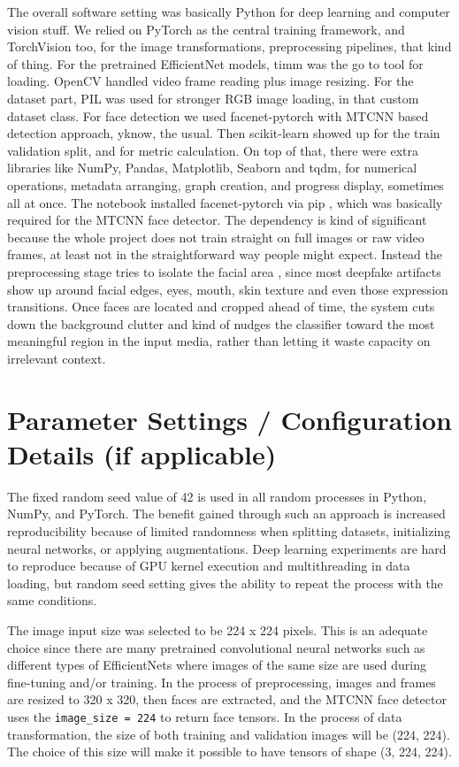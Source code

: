 \documentclass[12pt,a4paper]{report}
\begin{document}
The overall software setting was basically Python for deep learning and computer vision stuff. We relied on PyTorch as the central training framework, and TorchVision too, for the image transformations, preprocessing pipelines, that kind of thing. For the pretrained EfficientNet models, timm was the go to tool for loading. OpenCV handled video frame reading plus image resizing. For the dataset part, PIL was used for stronger RGB image loading, in that custom dataset class. For face detection we used facenet-pytorch with MTCNN based detection approach, yknow, the usual. Then scikit-learn showed up for the train validation split, and for metric calculation.  
On top of that, there were extra libraries like NumPy, Pandas, Matplotlib, Seaborn and tqdm, for numerical operations, metadata arranging, graph creation, and progress display, sometimes all at once.
The notebook installed facenet-pytorch via pip , which was basically required for the MTCNN face detector. The dependency is kind of significant because the whole project does not train straight on full images or raw video frames, at least not in the straightforward way people might expect. Instead the preprocessing stage tries to isolate the facial area , since most deepfake artifacts show up around facial edges, eyes, mouth, skin texture and even those expression transitions. Once faces are located and cropped ahead of time, the system cuts down the background clutter and kind of nudges the classifier toward the most meaningful region in the input media, rather than letting it waste capacity on irrelevant context.
\section{Parameter Settings / Configuration Details (if applicable)}
The fixed random seed value of 42 is used in all random processes in Python, NumPy, and PyTorch. The benefit gained through such an approach is increased reproducibility because of limited randomness when splitting datasets, initializing neural networks, or applying augmentations. Deep learning experiments are hard to reproduce because of GPU kernel execution and multithreading in data loading, but random seed setting gives the ability to repeat the process with the same conditions.

The image input size was selected to be 224 x 224 pixels. This is an adequate choice since there are many pretrained convolutional neural networks such as different types of EfficientNets where images of the same size are used during fine-tuning and/or training. In the process of preprocessing, images and frames are resized to 320 x 320, then faces are extracted, and the MTCNN face detector uses the \texttt{image\_size = 224} to return face tensors. In the process of data transformation, the size of both training and validation images will be (224, 224). The choice of this size will make it possible to have tensors of shape (3, 224, 224).
\end{document}

